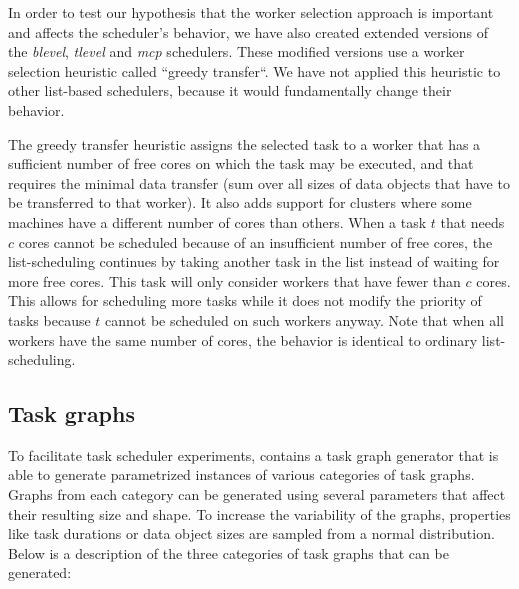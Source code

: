 In order to test our hypothesis that the worker selection approach is important and affects the
scheduler's behavior, we have also created extended versions of the \emph{blevel},
\emph{tlevel} and \emph{mcp} schedulers. These modified versions use a
worker selection heuristic called ``greedy transfer``. We have not applied this heuristic to other
list-based schedulers, because it would fundamentally change their behavior.

The greedy transfer heuristic assigns the selected task to a worker that has a sufficient number of
free cores on which the task may be executed, and that requires the minimal data transfer (sum over
all sizes of data objects that have to be transferred to that worker). It also adds support for
clusters where some machines have a different number of cores than others. When a task
$t$ that needs $c$ cores cannot be scheduled because of an
insufficient number of free cores, the list-scheduling continues by taking another task in the list
instead of waiting for more free cores. This task will only consider workers that have fewer than
$c$ cores. This allows for scheduling more tasks while it does not modify the
priority of tasks because $t$ cannot be scheduled on such workers anyway. Note
that when all workers have the same number of cores, the behavior is identical to ordinary
list-scheduling.

\subsection{Task graphs}
To facilitate task scheduler experiments, \estee{} contains a task graph generator
that is able to generate parametrized instances of various categories of task graphs. Graphs from
each category can be generated using several parameters that affect their resulting size and shape.
To increase the variability of the graphs, properties like task durations or data object sizes are
sampled from a normal distribution. Below is a description of the three categories of task graphs
that can be generated:

